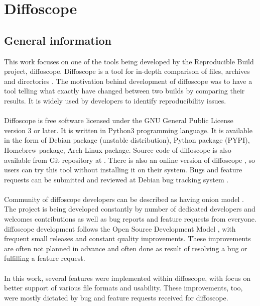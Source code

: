 \section{Diffoscope}

\subsection[General information]{General information}
This work focuses on one of the tools being developed by the
Reproducible Build project, diffoscope.
Diffoscope is a tool for in-depth comparison of files, archives and
directories \autocite{dfs}.
The motivation behind development of diffoscope was to have a tool
telling what exactly have changed between two builds by comparing
their results. It is widely used by developers to identify reproducibility issues.\\\\
Diffoscope is free software licensed under the GNU General Public
License version 3 or later. It is written in Python3 programming language.
It is available in the form of Debian package (unstable distribution),
Python package (PYPI), Homebrew package, Arch Linux package. Source code
of diffoscope is also available from Git repository at \autocite{dfs-git}.
There is also an online version of diffoscope \autocite{try-dfs}, so users
can try this tool without installing it on their system.
Bugs and feature requests can be submitted and reviewed at Debian
bug tracking system \autocite{dfs-bugs}.\\\\
Community of diffoscope developers can be described as having
onion model \autocite{aberdour2007achieving}.
The project is being developed constantly by number of dedicated
developers and welcomes contributions as well as bug reports
and feature requests from everyone.
diffoscope development follows the Open Source Development Model
\autocite{osdm}, with frequent small releases and constant quality improvements.
These improvements are often not planned in advance and often
done as result of resolving a bug or fulfilling a feature request.\\\\
In this work, several features were implemented  within diffoscope,
with focus on better support of various file formats and usability.
These improvements, too, were mostly dictated by bug and feature requests
received for diffoscope.

